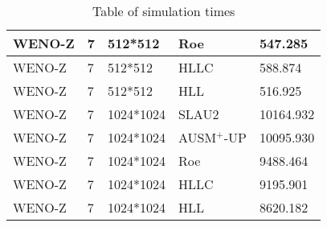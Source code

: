 \begin{table}[!ht]
\begin{tabular}{|l|l|l|l|l|}
        WENO-Z & 7 & 512*512 & Roe & 547.285 \\ \hline
        WENO-Z & 7 & 512*512 & HLLC & 588.874 \\ \hline
        WENO-Z & 7 & 512*512 & HLL & 516.925 \\ \hline
        WENO-Z & 7 & 1024*1024 & SLAU2 & 10164.932 \\ \hline
        WENO-Z & 7 & 1024*1024 & AUSM$^+$-UP & 10095.930 \\ \hline
        WENO-Z & 7 & 1024*1024 & Roe & 9488.464 \\ \hline
        WENO-Z & 7 & 1024*1024 & HLLC & 9195.901 \\ \hline
        WENO-Z & 7 & 1024*1024 & HLL & 8620.182 \\ \hline
    \end{tabular}
    \caption{Table of simulation times}
\end{table}

